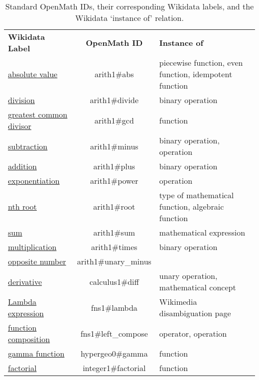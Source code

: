 \documentclass[a4paper]{article}
\begin{document}
\begin{table}[p]
\caption{Standard OpenMath IDs, their corresponding Wikidata labels, and the Wikidata `instance of' relation.}
\vspace{2em}
\label{tb.tb1}
\begin{tabular}{p{.23\linewidth}cp{.5\linewidth}}
\textbf{Wikidata Label} & \textbf{OpenMath ID} & \textbf{Instance of} \\
\href{https://www.wikidata.org/entity/Q120812}{absolute value} & arith1\#abs & piecewise function, even function, idempotent function \\
\href{https://www.wikidata.org/entity/Q1226939}{division} & arith1\#divide & binary operation \\
\href{https://www.wikidata.org/entity/Q131752}{greatest common divisor} & arith1\#gcd & function \\
\href{https://www.wikidata.org/entity/Q40754}{subtraction} & arith1\#minus & binary operation, operation \\
\href{https://www.wikidata.org/entity/Q32043}{addition} & arith1\#plus & binary operation \\
\href{https://www.wikidata.org/entity/Q33456}{exponentiation} & arith1\#power & operation \\
\href{https://www.wikidata.org/entity/Q601053}{nth root} & arith1\#root & type of mathematical function, algebraic function \\
\href{https://www.wikidata.org/entity/Q218005}{sum} & arith1\#sum & mathematical expression \\
\href{https://www.wikidata.org/entity/Q40276}{multiplication} & arith1\#times & binary operation \\
\href{https://www.wikidata.org/entity/Q715358}{opposite number} & arith1\#unary\_minus &  \\
\href{https://www.wikidata.org/entity/Q29175}{derivative} & calculus1\#diff & unary operation, mathematical concept \\
\href{https://www.wikidata.org/entity/Q6481163}{Lambda expression} & fns1\#lambda & Wikimedia disambiguation page \\
\href{https://www.wikidata.org/entity/Q244761}{function composition} & fns1\#left\_compose & operator, operation \\
\href{https://www.wikidata.org/entity/Q190573}{gamma function} & hypergeo0\#gamma & function \\
\href{https://www.wikidata.org/entity/Q120976}{factorial} & integer1\#factorial & function \\

\end{tabular}
\end{table}
\end{document}

